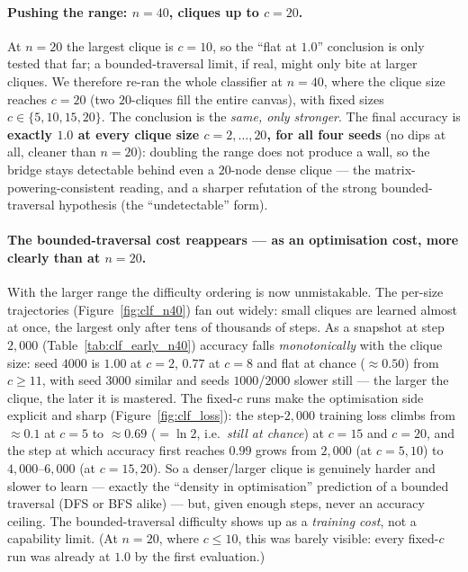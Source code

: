 \documentclass[11pt,a4paper]{article}
\begin{document}
\paragraph{Pushing the range: $n=40$, cliques up to $c=20$.} At $n=20$ the largest clique is
$c=10$, so the ``flat at $1.0$'' conclusion is only tested that far; a bounded-traversal limit, if
real, might only bite at larger cliques. We therefore re-ran the whole classifier at $n=40$, where
the clique size reaches $c=20$ (two $20$-cliques fill the entire canvas), with fixed sizes
$c\in\{5,10,15,20\}$. The conclusion is the \emph{same, only stronger}. The final accuracy is
\textbf{exactly $1.0$ at every clique size $c=2,\dots,20$, for all four seeds} (no dips at all,
cleaner than $n=20$): doubling the range does not produce a wall, so the bridge stays detectable
behind even a $20$-node dense clique --- the matrix-powering-consistent reading, and a sharper
refutation of the strong bounded-traversal hypothesis (the ``undetectable'' form).

\paragraph{The bounded-traversal cost reappears --- as an optimisation cost, more clearly than at
$n=20$.} With the larger range the difficulty ordering is now unmistakable. The per-size
trajectories (Figure~\ref{fig:clf_n40}) fan out widely: small cliques are learned almost at once,
the largest only after tens of thousands of steps. As a snapshot at step $2{,}000$
(Table~\ref{tab:clf_early_n40}) accuracy falls \emph{monotonically} with the clique size: seed
$4000$ is $1.00$ at $c=2$, $0.77$ at $c=8$ and flat at chance ($\approx0.50$) from $c\ge11$, with
seed $3000$ similar and seeds $1000$/$2000$ slower still --- the larger the clique, the later it is
mastered. The fixed-$c$ runs make the optimisation side explicit and sharp
(Figure~\ref{fig:clf_loss}): the step-$2{,}000$ training loss climbs from $\approx0.1$ at $c=5$ to
$\approx0.69$ ($=\ln 2$, i.e.\ \emph{still at chance}) at $c=15$ and $c=20$, and the step at which
accuracy first reaches $0.99$ grows from $2{,}000$ (at $c=5,10$) to $4{,}000$--$6{,}000$ (at
$c=15,20$). So a
denser/larger clique is genuinely harder and slower to learn --- exactly the ``density in
optimisation'' prediction of a bounded traversal (DFS or BFS alike) --- but, given enough steps,
never an accuracy ceiling. The bounded-traversal difficulty shows up as a \emph{training cost}, not a capability
limit. (At $n=20$, where $c\le10$, this was barely visible: every fixed-$c$ run was already at
$1.0$ by the first evaluation.)
\end{document}
